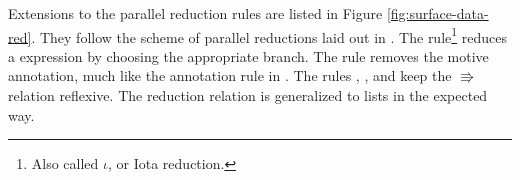 
Extensions to the parallel reduction rules are listed in Figure \ref{fig:surface-data-red}.
They follow the scheme of parallel reductions laid out in .
The  rule\footnote{
  Also called $\iota$, or Iota reduction.
} reduces a \case{} expression by choosing the appropriate branch.
The  rule removes the motive annotation, much like the annotation rule in .
The rules , , and  keep the $\Rrightarrow$ relation reflexive.
The reduction relation is generalized to lists in the expected way.

